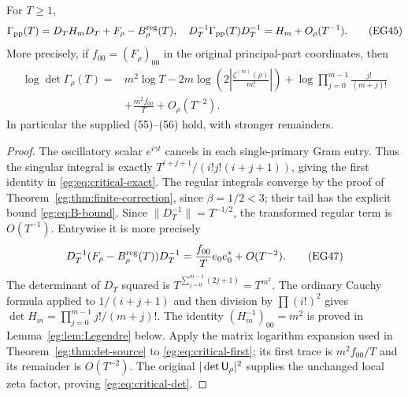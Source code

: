 \begin{egtheorem}
\label{eg:thm:critical}
For $T\ge1$,
\[
 \Gamma_{\rm pp}(T)=D_TH_mD_T+F_\rho-B_\rho^{\rm reg}(T),
 \quad D_T^{-1}\Gamma_{\rm pp}(T)D_T^{-1}=H_m+O_\rho(T^{-1}).
 \tag{EG45}\label{eg:eq:critical-exact}
\]
More precisely, if $f_{00}=(F_\rho)_{00}$ in the original principal-part
coordinates, then
\[
 \begin{split}
 \log\det\Gamma_\rho(T)={}&m^2\log T
 -2m\log\left(2\left|\frac{\zeta^{(m)}(\rho)}{m!}\right|\right)
 +\log\prod_{j=0}^{m-1}\frac{j!}{(m+j)!}\\
 &+\frac{m^2 f_{00}}T+O_\rho(T^{-2}).
 \end{split}\tag{EG46}\label{eg:eq:critical-det}
\]
In particular the supplied (55)--(56) hold, with stronger remainders.
\end{egtheorem}
\begin{proof}
The oscillatory scalar $e^{i\gamma t}$ cancels in each single-primary
Gram entry. Thus the singular integral is exactly
$T^{i+j+1}/(i!j!(i+j+1))$, giving the first identity in
\eqref{eg:eq:critical-exact}. The regular integrals converge by the
proof of Theorem~\ref{eg:thm:finite-correction}, since $\beta=1/2<3$;
their tail has the explicit bound \eqref{eg:eq:B-bound}. Since
$\|D_T^{-1}\|=T^{-1/2}$, the transformed regular term is $O(T^{-1})$.
Entrywise it is more precisely
\[
 D_T^{-1}(F_\rho-B_\rho^{\rm reg}(T))D_T^{-1}
                       =\frac{f_{00}}T e_0e_0^*+O(T^{-2}).
 \tag{EG47}\label{eg:eq:critical-first}
\]
The determinant of $D_T$ squared is $T^{\sum_{j=0}^{m-1}(2j+1)}
=T^{m^2}$. The ordinary Cauchy formula applied to $1/(i+j+1)$
and then division by $\prod(i!)^2$ gives
$\det H_m=\prod_{j=0}^{m-1}j!/(m+j)!$.
The identity $(H_m^{-1})_{00}=m^2$ is proved in
Lemma~\ref{eg:lem:Legendre} below. Apply the matrix logarithm expansion
used in Theorem~\ref{eg:thm:det-source} to \eqref{eg:eq:critical-first};
its first trace is $m^2f_{00}/T$ and its remainder is $O(T^{-2})$.
The original $|\det\mathsf U_\rho|^2$ supplies the unchanged local zeta
factor, proving \eqref{eg:eq:critical-det}.
\end{proof}

